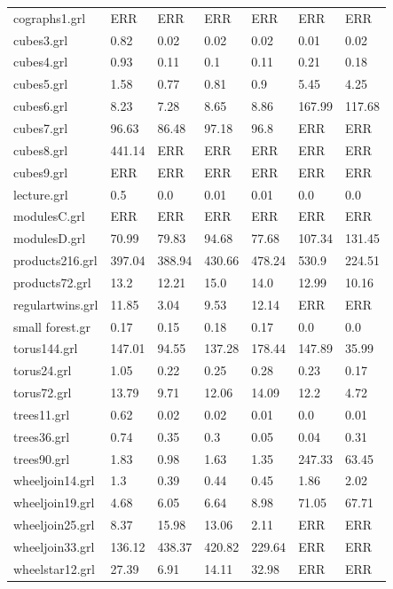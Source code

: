 \documentclass[11pt]{article}
\begin{document}
\begin{table}[h!]
\begin{tabularx}{\textwidth}{|l|X|X|X|X|X|X|}
		cographs1.grl & ERR & ERR & ERR & ERR & ERR & ERR \\
		cubes3.grl & 0.82 & 0.02 & 0.02 & 0.02 & 0.01 & 0.02 \\
		cubes4.grl & 0.93 & 0.11 & 0.1 & 0.11 & 0.21 & 0.18 \\
		cubes5.grl & 1.58 & 0.77 & 0.81 & 0.9 & 5.45 & 4.25 \\
		cubes6.grl & 8.23 & 7.28 & 8.65 & 8.86 & 167.99 & 117.68 \\
		cubes7.grl & 96.63 & 86.48 & 97.18 & 96.8 & ERR & ERR \\
		cubes8.grl & 441.14 & ERR & ERR & ERR & ERR & ERR \\
		cubes9.grl & ERR & ERR & ERR & ERR & ERR & ERR \\
		lecture.grl & 0.5 & 0.0 & 0.01 & 0.01 & 0.0 & 0.0 \\
		modulesC.grl & ERR & ERR & ERR & ERR & ERR & ERR \\
		modulesD.grl & 70.99 & 79.83 & 94.68 & 77.68 & 107.34 & 131.45 \\
		products216.grl & 397.04 & 388.94 & 430.66 & 478.24 & 530.9 & 224.51 \\
		products72.grl & 13.2 & 12.21 & 15.0 & 14.0 & 12.99 & 10.16 \\
		regulartwins.grl & 11.85 & 3.04 & 9.53 & 12.14 & ERR & ERR \\
		small forest.gr & 0.17 & 0.15 & 0.18 & 0.17 & 0.0 & 0.0 \\
		torus144.grl & 147.01 & 94.55 & 137.28 & 178.44 & 147.89 & 35.99 \\
		torus24.grl & 1.05 & 0.22 & 0.25 & 0.28 & 0.23 & 0.17 \\
		torus72.grl & 13.79 & 9.71 & 12.06 & 14.09 & 12.2 & 4.72 \\
		trees11.grl & 0.62 & 0.02 & 0.02 & 0.01 & 0.0 & 0.01 \\
		trees36.grl & 0.74 & 0.35 & 0.3 & 0.05 & 0.04 & 0.31 \\
		trees90.grl & 1.83 & 0.98 & 1.63 & 1.35 & 247.33 & 63.45 \\
		wheeljoin14.grl & 1.3 & 0.39 & 0.44 & 0.45 & 1.86 & 2.02 \\
		wheeljoin19.grl & 4.68 & 6.05 & 6.64 & 8.98 & 71.05 & 67.71 \\
		wheeljoin25.grl & 8.37 & 15.98 & 13.06 & 2.11 & ERR & ERR \\
		wheeljoin33.grl & 136.12 & 438.37 & 420.82 & 229.64 & ERR & ERR \\
		wheelstar12.grl & 27.39 & 6.91 & 14.11 & 32.98 & ERR & ERR \\

\end{tabularx}
\end{table}
\end{document}
